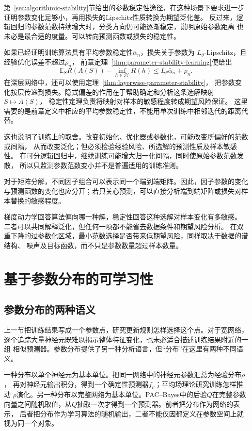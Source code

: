 第~\ref{sec:algorithmic-stability}节给出的参数稳定性途径，在这种场景下要求进一步
证明参数变化足够小，再用损失的Lipschitz性质转换为期望泛化差。
反过来，逻辑回归的参数范数持续增大时，分类方向仍可能逐渐稳定，说明原始参数距离
也未必是最合适的度量。可以转向预测函数或损失的稳定性。

如果已经证明训练算法具有平均参数稳定性$\bar\alpha_n$，损失关于参数为
$L_\theta$-Lipschitz，且经验优化误差不超过$\rho_n$，
前章定理~\ref{thm:parameter-stability-learning}便给出
\[
 \mathbb E_S R(A(S))-\inf_{h\in\mathcal H}R(h)
 \leq L_\theta\bar\alpha_n+\rho_n.
\]
在深层网络中，还可以使用定理~\ref{thm:layerwise-parameter-stability}，
把参数变化按层传递到损失。隐式偏差的作用在于帮助确定和分析这条选解映射$S\mapsto A(S)$，
稳定性定理负责将映射对样本的敏感程度转成期望风险保证。
这里需要的是前章定义中相应的平均参数稳定性，不能用单次训练中相邻迭代的距离代替。

这也说明了训练上的取舍。改变初始化、优化器或参数化，可能改变所偏好的范数或间隔，
从而改变泛化；但必须检验经验风险、所选解的预测性质及样本敏感性。
在可分逻辑回归中，继续训练可能增大归一化间隔，同时使原始参数范数发散，
所以只监测参数范数变小并不是普遍适用的训练准则。

对于矩阵分解，不同因子组合可以表示同一个端到端矩阵。因此，因子参数的变化与预测函数的变化也应分开；若只关心预测，可以直接分析端到端矩阵或损失对样本替换的敏感程度。

梯度动力学回答算法偏向哪一种解，稳定性回答这种选解对样本变化有多敏感。
二者可以共同解释泛化，但任何一项都不能省去数据条件和期望风险分析。
在双重下降的过参数化区域，最小范数选择是否带来低期望风险，同样取决于数据的谱结构、
噪声及目标函数，而不只是参数数量超过样本数量。

\section{基于参数分布的可学习性}
\label{sec:parameter-distributions}

\subsection{参数分布的两种语义}

上一节把训练结果写成一个参数点，研究更新规则怎样选择这个点。对于宽网络，
逐个追踪大量神经元既难以揭示整体特征变化，也未必适合描述训练结果附近的一组
相似预测器。参数分布提供了另一种分析语言，但“分布”在这里有两种不同语义。

一种分布以单个神经元为基本单位。把同一网络中的神经元参数汇总为经验分布$\rho$，
再对神经元输出积分，得到一个确定性预测器$f_\rho$；平均场理论研究训练怎样推动
$\rho$演化。另一种分布以完整网络为基本单位。PAC--Bayes中的后验$Q$在完整参数
向量之间随机取值，从$Q$抽取一次才得到一个预测器。前者把分布作为网络的表示，
后者把分布作为学习算法的随机输出，二者不能仅因都定义在参数空间上就视为同一个对象。

